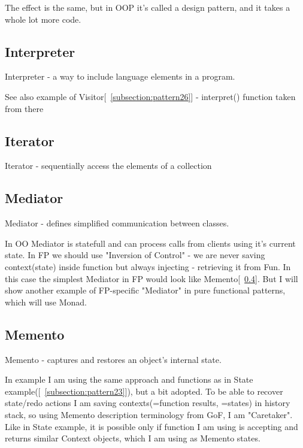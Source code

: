     The effect is the same, but in OOP it's called a design pattern, and it takes a whole lot more code.~\cite{res5}

\subsection{Interpreter} \label{subsection:pattern17}
    Interpreter - a way to include language elements in a program.

See also example of Visitor[~\ref{subsection:pattern26}] - interpret() function taken from there 

\subsection{Iterator} \label{subsection:pattern18}
    Iterator - sequentially access the elements of a collection

\subsection{Mediator} \label{subsection:pattern19}
    Mediator - defines simplified communication between classes. 
    
In OO Mediator is statefull and can process calls from clients using it's current state. In FP we should use "Inversion of Control" - we are never saving context(state) inside function but always injecting - retrieving it from Fun. In this case the simplest Mediator in FP would look like Memento[~\ref{subsection:pattern20}]. But I will show another example of FP-specific "Mediator" in pure functional patterns, which will use Monad.

\subsection{Memento} \label{subsection:pattern20}
    Memento - captures and restores an object's internal state. 

In example I am using the same approach and functions as in State example([~\ref{subsection:pattern23}]), but a bit adopted. To be able to recover state/redo actions I am saving contexts(=function results, =states) in history stack, so using Memento description terminology from GoF, I am "Caretaker". Like in State example, it is possible only if function I am using is accepting and returns similar Context objects, which I am using as Memento states.

